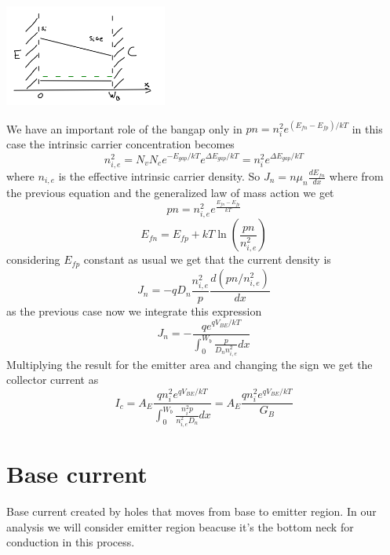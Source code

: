 \centering
\includegraphics[width=0.4\textwidth]{bjt6.png}\\
\raggedright

We have an important role of the bangap only in $pn=n_i^2e^{(E_{fn}-E_{fp})/kT}$ in this case the intrinsic carrier concentration becomes
\begin{equation}
n_{i,e}^2=N_vN_ce^{-E_{gap}/kT}e^{\Delta E_{gap}/kT}=n_i^2e^{\Delta E_{gap}/kT}
\end{equation}
where $n_{i,e}$ is the effective intrinsic carrier density. 
So $J_n=n\mu_n \frac{dE_{fn}}{dx}$ where from the previous equation and the generalized law of mass action we get 
\begin{equation}
pn=n_{i,e}^2e^{\frac{E_{fn}-E_{fp}}{kT}}
\end{equation}
\begin{equation}
E_{fn}=E_{fp}+kT\ln(\frac{pn}{n_{i,e}^2})
\end{equation}
considering $E_{fp}$ constant as usual we get that the current density is 
\begin{equation}
J_n=-qD_n \frac{n_{i,e}^2}{p}\frac{d(pn/n_{i,e}^2)}{dx}
\end{equation}
as the previous case now we integrate this expression 
\begin{equation}
J_n=-\frac{qe^{qV_{BE}/kT}}{\int^{W_b}_0 \frac{p}{D_nn_{i,e}^2}dx}
\end{equation}
Multiplying the result for the emitter area and changing the sign we get the collector current as 
\begin{equation}
I_c=A_E \frac{qn_i^2 e^{qV_{BE}/kT}}{\int^{W_{b}}_0\frac{n_i^2p}{n_{i,e}^2D_n}dx}=A_E \frac{qn_i^2 e^{qV_{BE}/kT}}{G_B}
\end{equation}


\section{Base current}

Base current created by holes that moves from base to emitter region. In our analysis we will consider emitter region beacuse it's the bottom neck for conduction in this process.


